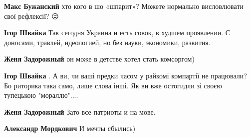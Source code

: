 \begin{itemize}
\begin{itemize}
 

\textbf{Макс Бужанский} хто кого в шо «шпарит»?
Можете нормально висловлювати свої рефлексії? 😜

 
\textbf{Ігор Швайка} Так сегодня Украина и есть совок, в худшем проявлении. С доносами, травлей, идеологией, но без науки, экономики, развития.

 
\textbf{Женя Задорожный} он може в детстве хотел стать комсоргом)

 
\textbf{Ігор Швайка} . А ви, чи ваші предки часом у райкомі компартії не працювали? Бо риторика така само, лише слова інші. Як ви вже остогидли зі своєю тупецькою "мораллю"....

 
\textbf{Женя Задорожный} Зато все патриоты и на мове.

 
\textbf{Александр Мордкович} И мечты сбылись)


\end{itemize}
\end{itemize}
